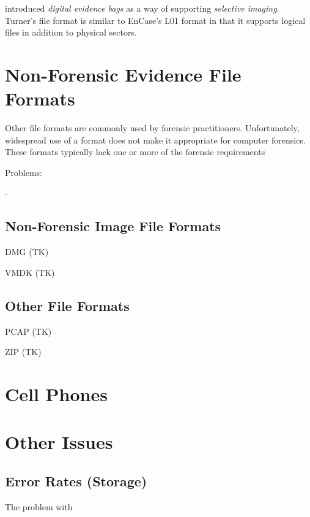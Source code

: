  introduced \emph{digital evidence bags}
as a way of supporting \emph{selective imaging}. Turner's file format
is similar to EnCase's L01 format in that it supports logical files in
addition to physical sectors.

\section{Non-Forensic Evidence File Formats}

Other file formats are commonly used  by forensic
practitioners. Unfortunately, widespread use of a format does not make
it appropriate for computer forensics. These formats typically lack
one or more of the forensic requirements

Problems:

 -

\subsection{Non-Forensic Image File Formats}

DMG  (TK)

VMDK (TK)


\subsection{Other File Formats}


PCAP (TK)

ZIP (TK)

\section{Cell Phones}
\cite{dfrws2011:TimothyVidasAndChengyeZhangAndNicolasChristin}


\section{Other Issues}
\subsection{Error Rates (Storage)}

The problem with 





